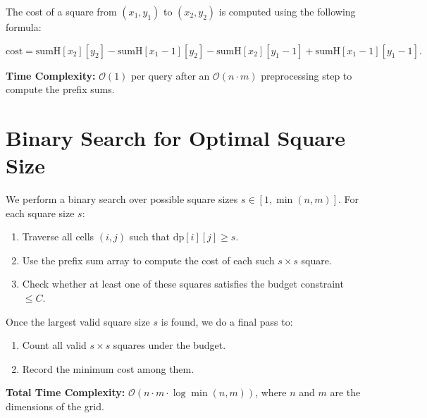 \documentclass{article}
\begin{document}
The cost of a square from $(x_1, y_1)$ to $(x_2, y_2)$ is computed using the following formula:

\[
\text{cost} = \text{sumH}[x_2][y_2] - \text{sumH}[x_1-1][y_2] - \text{sumH}[x_2][y_1-1] + \text{sumH}[x_1-1][y_1-1].
\]

\textbf{Time Complexity:} $\mathcal{O}(1)$ per query after an $\mathcal{O}(n \cdot m)$ preprocessing step to compute the prefix sums.

\section{Binary Search for Optimal Square Size}

We perform a binary search over possible square sizes $s \in [1, \min(n, m)]$. For each square size $s$:

\begin{enumerate}
  \item Traverse all cells $(i, j)$ such that $\text{dp}[i][j] \geq s$.
  \item Use the prefix sum array to compute the cost of each such $s \times s$ square.
  \item Check whether at least one of these squares satisfies the budget constraint $\leq C$.
\end{enumerate}

Once the largest valid square size $s$ is found, we do a final pass to:

\begin{enumerate}
  \item Count all valid $s \times s$ squares under the budget.
  \item Record the minimum cost among them.
\end{enumerate}

\textbf{Total Time Complexity:} $\mathcal{O}(n \cdot m \cdot \log \min(n,m))$, where $n$ and $m$ are the dimensions of the grid.
\end{document}
